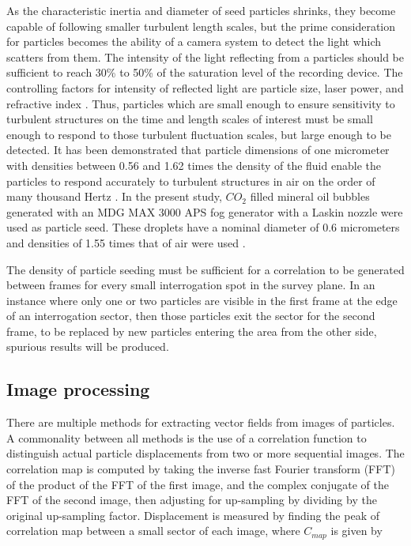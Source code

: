 As the characteristic inertia and diameter of seed particles shrinks, they 
become capable of following 
smaller turbulent length scales, but the prime consideration for particles 
becomes the ability of a camera system to detect the light which scatters from 
them. The intensity of the light reflecting from a 
particles should be sufficient to reach 30\% to 50\% of the saturation level of 
the recording device. The controlling factors for intensity of reflected light 
are particle size, laser power, and refractive index \cite{adrian2011}. Thus, 
particles which are small enough to ensure sensitivity to turbulent structures 
on the time and length scales of interest must be small enough to respond to 
those turbulent fluctuation scales, but large enough to be detected. It has 
been demonstrated that particle dimensions of one micrometer with densities 
between 0.56 and 1.62 times the density of the fluid enable the particles to 
respond accurately to turbulent structures in air on the order of many thousand 
Hertz \cite{mei1996}. In the 
present study, $CO_2$ filled mineral oil bubbles generated with an MDG MAX 3000 
APS fog generator with a Laskin 
nozzle were used as particle seed. These droplets have a nominal 
diameter of 0.6 micrometers and densities of 1.55 times that of air were used 
\cite{mdgfog}.

The density of particle seeding must be sufficient for a correlation to be 
generated between frames for every small interrogation spot in the survey 
plane. In an instance where only one or two particles are visible in the first 
frame at the edge of an interrogation sector, then those particles exit the 
sector for the second frame, to be replaced by new particles 
entering the area from the other side, spurious results will be produced.


\subsection{Image processing}

There are multiple methods for extracting vector fields from images of 
particles. A commonality between all methods is the use of a correlation 
function to distinguish actual particle displacements from two or more 
sequential images. The correlation map is 
computed by taking the inverse fast Fourier transform (FFT) of the product of 
the FFT of the first image, and the complex conjugate of the FFT of the second 
image, then adjusting for up-sampling by dividing by the original up-sampling 
factor. Displacement is measured by finding the peak of correlation map 
between a small sector of each image, where $C_{map}$ is given by

